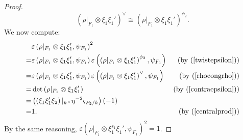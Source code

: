 \documentclass[12pt]{amsart}
\theoremstyle{Theorem}
\theoremstyle{Theorem}
\theoremstyle{Theorem}
\theoremstyle{Theorem}
\theoremstyle{Plain}
\theoremstyle{remark}
\theoremstyle{remark}
\theoremstyle{Definition}
\begin{document}
\begin{proof}
    \begin{equation}
        \label{rhocongrho}
        \left( \rho|_{ F_1 } \otimes \xi_1 \xi_1' \right)^\vee \cong \left( \rho|_{ F_1 } \otimes \xi_1 \xi_1' \right)^{ \phi_2 }.
    \end{equation}       
    We now compute:
    \[
        \begin{aligned}
             & \varepsilon \left( \rho|_{ F_1 } \otimes \xi_1 \xi_1', \psi_{ F_1 } \right)^2\\
            =& \varepsilon \left( \rho|_{ F_1 } \otimes \xi_1 \xi_1', \psi_{ F_1 } \right) \varepsilon \left( \left( \rho|_{ F_1 } \otimes \xi_1 \xi_1' \right)^{ \phi_2 }, \psi_{ F_1 } \right)                                      & ( \text{by } ( \ref{twistepsilon} ) )                                                          \\
            =& \varepsilon \left( \rho|_{ F_1 } \otimes \xi_1 \xi_1', \psi_{ F_1 } \right) \varepsilon \left( \left( \rho|_{ F_1 } \otimes \xi_1 \xi_1' \right)^\vee, \psi_{ F_1 } \right)                                             & ( \text{by } ( \ref{rhocongrho} ) )                                                            \\
            =& \det \left( \rho|_{ F_1 } \otimes \xi_1 \xi_1' \right) & ( \text{by } ( \ref{contraepsilon} ) )                                                         \\
            =& \left( \left( \xi_1 \xi_1' \xi_2 \right)|_{ k^\times } \eta^{-2} \varsigma_{ F_2/k } \right) (-1)                                                            \\
            =& 1.                                                     & ( \text{by }( \ref{centralprod} ) )
        \end{aligned}
    \]
    By the same reasoning, $ \varepsilon \left( \rho|_{ F_1 } \otimes \xi_1^{ s_1 } \xi_1', \psi_{ F_1 } \right)^2 = 1 $.
    

\end{proof}
\end{document}
